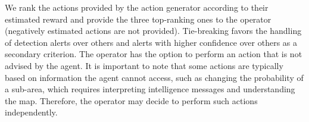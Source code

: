 We rank the actions provided by the action generator according to their estimated reward and provide the three top-ranking ones to the operator (negatively estimated actions are not provided). Tie-breaking favors the handling of detection alerts over others and alerts with higher confidence over others as a secondary criterion. 
The operator has the option to perform an action that is not advised by the agent. It is important to note that some actions are typically based on information the agent cannot access, such as changing the probability of a sub-area, which requires interpreting intelligence messages and understanding the map. Therefore, the operator may decide to perform such actions independently.





